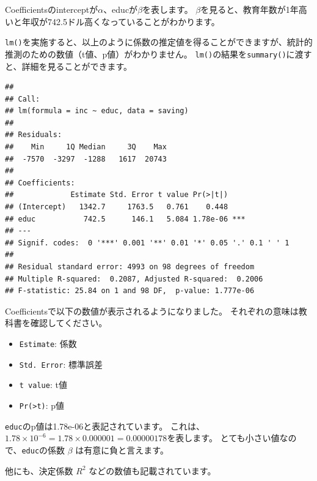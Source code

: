 \documentclass[]{book}
\newenvironment{Shaded}{\begin{snugshade}}{\end{snugshade}}
\newcommand{\KeywordTok}[1]{\textcolor[rgb]{0.13,0.29,0.53}{\textbf{#1}}}
\newcommand{\DataTypeTok}[1]{\textcolor[rgb]{0.13,0.29,0.53}{#1}}
\newcommand{\StringTok}[1]{\textcolor[rgb]{0.31,0.60,0.02}{#1}}
\newcommand{\OperatorTok}[1]{\textcolor[rgb]{0.81,0.36,0.00}{\textbf{#1}}}
\newcommand{\NormalTok}[1]{#1}
\providecommand{\tightlist}{%
  \setlength{\itemsep}{0pt}\setlength{\parskip}{0pt}}
\begin{document}
Coefficientsのinterceptが\(\alpha\)、educが\(\beta\)を表します。
\(\beta\)を見ると、教育年数が1年高いと年収が742.5ドル高くなっていることがわかります。

\texttt{lm()}を実施すると、以上のように係数の推定値を得ることができますが、統計的推測のための数値（t値、p値）がわかりません。
\texttt{lm()}の結果を\texttt{summary()}に渡すと、詳細を見ることができます。

\begin{Shaded}
\end{Shaded}

\begin{verbatim}
## 
## Call:
## lm(formula = inc ~ educ, data = saving)
## 
## Residuals:
##    Min     1Q Median     3Q    Max 
##  -7570  -3297  -1288   1617  20743 
## 
## Coefficients:
##             Estimate Std. Error t value Pr(>|t|)    
## (Intercept)   1342.7     1763.5   0.761    0.448    
## educ           742.5      146.1   5.084 1.78e-06 ***
## ---
## Signif. codes:  0 '***' 0.001 '**' 0.01 '*' 0.05 '.' 0.1 ' ' 1
## 
## Residual standard error: 4993 on 98 degrees of freedom
## Multiple R-squared:  0.2087, Adjusted R-squared:  0.2006 
## F-statistic: 25.84 on 1 and 98 DF,  p-value: 1.777e-06
\end{verbatim}

Coefficientsで以下の数値が表示されるようになりました。
それぞれの意味は教科書を確認してください。

\begin{itemize}
\tightlist
\item
  \texttt{Estimate}: 係数
\item
  \texttt{Std.\ Error}: 標準誤差
\item
  \texttt{t\ value}: t値
\item
  \texttt{Pr(\textgreater{}\textbar{}t\textbar{})}: p値
\end{itemize}

\texttt{educ}のp値は1.78e-06と表記されています。
これは、\(1.78 \times 10^{-6} = 1.78 \times 0.000001 = 0.00000178\)を表します。
とても小さい値なので、\texttt{educ}の係数 \(\beta\)
は有意に負と言えます。

他にも、決定係数 \(R^2\) などの数値も記載されています。
\end{document}
